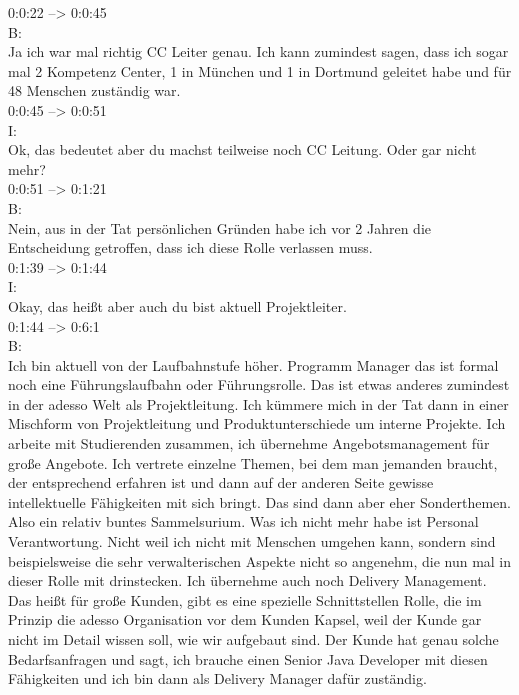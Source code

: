 0:0:22 --> 0:0:45\\
B:\\
Ja ich war mal richtig CC Leiter genau. Ich kann zumindest sagen, dass ich sogar mal 2 Kompetenz Center, 1 in München und 1 in Dortmund geleitet habe und für 48 Menschen zuständig war.\\

0:0:45 --> 0:0:51\\
I:\\
Ok, das bedeutet aber du machst teilweise noch CC Leitung. Oder gar nicht mehr?\\

0:0:51 --> 0:1:21\\
B:\\
Nein, aus in der Tat persönlichen Gründen habe ich vor 2 Jahren die Entscheidung getroffen, dass ich diese Rolle verlassen muss.\\

0:1:39 --> 0:1:44\\
I:\\
Okay, das heißt aber auch du bist aktuell Projektleiter.\\

0:1:44 --> 0:6:1\\
B:\\
Ich bin aktuell von der Laufbahnstufe höher. Programm Manager das ist formal noch eine Führungslaufbahn oder Führungsrolle. Das ist etwas anderes zumindest in der adesso Welt als Projektleitung. Ich kümmere mich in der Tat dann in einer Mischform von Projektleitung und Produktunterschiede um interne Projekte. Ich arbeite mit Studierenden zusammen, ich übernehme Angebotsmanagement für große Angebote. Ich vertrete einzelne Themen, bei dem man jemanden braucht, der entsprechend erfahren ist und dann auf der anderen Seite gewisse intellektuelle Fähigkeiten mit sich bringt. Das sind dann aber eher Sonderthemen. Also ein relativ buntes Sammelsurium. Was ich nicht mehr habe ist Personal Verantwortung. Nicht weil ich nicht mit Menschen umgehen kann, sondern sind beispielsweise die sehr verwalterischen Aspekte nicht so angenehm, die nun mal in dieser Rolle mit drinstecken. Ich übernehme auch noch Delivery Management. Das heißt für große Kunden, gibt es eine spezielle Schnittstellen Rolle, die im Prinzip die adesso Organisation vor dem Kunden Kapsel, weil der Kunde gar nicht im Detail wissen soll, wie wir aufgebaut sind. Der Kunde hat genau solche Bedarfsanfragen und sagt, ich brauche einen Senior Java Developer mit diesen Fähigkeiten und ich bin dann als Delivery Manager dafür zuständig.\\

